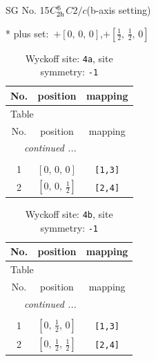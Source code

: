 \documentclass[fleqn,8pt]{jsarticle}
\begin{document}
\setcounter{MaxMatrixCols}{32}

\renewcommand{\tablename}{Table~}
\renewcommand{\figurename}{Figure~}
\begin{center}
\LARGE
SG No. 15\quad$C_{\rm 2h}^{6}$\quad$C2/c$\quad(b-axis setting)\quad[ monoclinic ]
\end{center}
* plus set:\,\,\,$+\left[ 0,\, 0,\, 0 \right]$,\quad $+\left[ \frac{1}{2},\, \frac{1}{2},\, 0 \right]$
\renewcommand{\arraystretch}{1.2}
\begin{longtable}{ccc}
\caption{Wyckoff site: {\tt 4a}, site symmetry: {\tt -1}}
 \\
 \hline \hline
No. & position & mapping \\ \hline \endfirsthead

\multicolumn{2}{l}{\tablename\ \thetable{}} \\
 \hline \hline
No. & position & mapping \\ \hline \endhead

 \hline \hline
\multicolumn{2}{r}{\footnotesize\it continued ...} \\ \endfoot

 \hline \hline
\multicolumn{2}{r}{} \\ \endlastfoot

1 & $\left[ 0,\, 0,\, 0 \right]$ & {\tt [1,3]} \\ \hline
2 & $\left[ 0,\, 0,\, \frac{1}{2} \right]$ & {\tt [2,4]} \\
\end{longtable}
\renewcommand{\arraystretch}{1.2}
\begin{longtable}{ccc}
\caption{Wyckoff site: {\tt 4b}, site symmetry: {\tt -1}}
 \\
 \hline \hline
No. & position & mapping \\ \hline \endfirsthead

\multicolumn{2}{l}{\tablename\ \thetable{}} \\
 \hline \hline
No. & position & mapping \\ \hline \endhead

 \hline \hline
\multicolumn{2}{r}{\footnotesize\it continued ...} \\ \endfoot

 \hline \hline
\multicolumn{2}{r}{} \\ \endlastfoot

1 & $\left[ 0,\, \frac{1}{2},\, 0 \right]$ & {\tt [1,3]} \\ \hline
2 & $\left[ 0,\, \frac{1}{2},\, \frac{1}{2} \right]$ & {\tt [2,4]} \\
\end{longtable}
\end{document}

